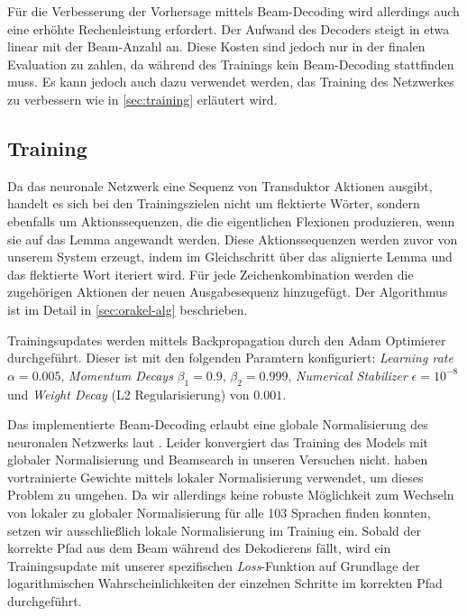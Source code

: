 \documentclass[a4paper]{article}
\begin{document}
Für die Verbesserung der Vorhersage mittels Beam-Decoding wird allerdings auch eine erhöhte Rechenleistung erfordert.
Der Aufwand des Decoders steigt in etwa linear mit der Beam-Anzahl an. 
Diese Kosten sind jedoch nur in der finalen Evaluation zu zahlen, da während des Trainings kein Beam-Decoding stattfinden muss.
Es kann jedoch auch dazu verwendet werden, das Training des Netzwerkes zu verbessern wie in \autoref{sec:training} erläutert wird.


\subsection{Training}
\label{sec:training}
Da das neuronale Netzwerk eine Sequenz von Transduktor Aktionen ausgibt, handelt es sich bei den Trainingszielen nicht um flektierte Wörter, sondern ebenfalls um Aktionssequenzen, die die eigentlichen Flexionen produzieren, wenn sie auf das Lemma angewandt werden.
Diese Aktionssequenzen werden zuvor von unserem System erzeugt, indem im Gleichschritt über das alignierte Lemma und das flektierte Wort iteriert wird.
Für jede Zeichenkombination werden die zugehörigen Aktionen der neuen Ausgabesequenz hinzugefügt.
Der Algorithmus ist im Detail in \autoref{sec:orakel-alg} beschrieben.


Trainingsupdates werden mittels Backpropagation durch den Adam Optimierer \citep{adam:KingmaB14} durchgeführt.
Dieser ist mit den folgenden Paramtern konfiguriert: \textit{Learning rate} $\alpha=0.005$, \textit{Momentum Decays} $\beta_1=0.9$, $\beta_2=0.999$, \textit{Numerical Stabilizer} $\epsilon=10^{-8}$ und \textit{Weight Decay} (L2 Regularisierung) von $0.001$.


Das implementierte Beam-Decoding erlaubt eine globale Normalisierung des neuronalen Netzwerks laut \citet{globalnorm:AndorAWSPGPC16}.
Leider konvergiert das Training des Models mit globaler Normalisierung und Beamsearch in unseren Versuchen nicht.
\citet{globalnorm:AndorAWSPGPC16} haben vortrainierte Gewichte mittels lokaler Normalisierung verwendet, um dieses Problem zu umgehen.
Da wir allerdings keine robuste Möglichkeit zum Wechseln von lokaler zu globaler Normalisierung für alle 103 Sprachen finden konnten, setzen wir ausschließlich lokale Normalisierung im Training ein.
Sobald der korrekte Pfad aus dem Beam während des Dekodierens fällt, wird ein Trainingsupdate mit unserer spezifischen \textit{Loss}-Funktion auf Grundlage der logarithmischen Wahrscheinlichkeiten der einzelnen Schritte im korrekten Pfad durchgeführt.
\end{document}
